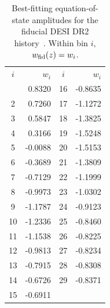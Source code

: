 \begin{table}[t]
\caption{Best-fitting equation-of-state amplitudes for the fiducial DESI DR2
history~\cite{Gu_2025}. Within bin $i$, $w_{\rm fid}(z)=w_i$.}
\label{tab:wz_bins}
\centering
\small
\begin{ruledtabular}
\begin{tabular}{crcr}
$i$ & $w_i$ & $i$ & $w_i$ \\
\colrule
1  & \phantom{-}0.8320 & 16 & -0.8635 \\
2  & \phantom{-}0.7260 & 17 & -1.1272 \\
3  & \phantom{-}0.5847 & 18 & -1.3825 \\
4  & \phantom{-}0.3166 & 19 & -1.5248 \\
5  & -0.0088           & 20 & -1.5153 \\
6  & -0.3689           & 21 & -1.3809 \\
7  & -0.7129           & 22 & -1.1999 \\
8  & -0.9973           & 23 & -1.0302 \\
9  & -1.1787           & 24 & -0.9123 \\
10 & -1.2336           & 25 & -0.8460 \\
11 & -1.1538           & 26 & -0.8225 \\
12 & -0.9813           & 27 & -0.8234 \\
13 & -0.7915           & 28 & -0.8308 \\
14 & -0.6726           & 29 & -0.8371 \\
15 & -0.6911           &    &         \\
\end{tabular}
\end{ruledtabular}
\end{table}
